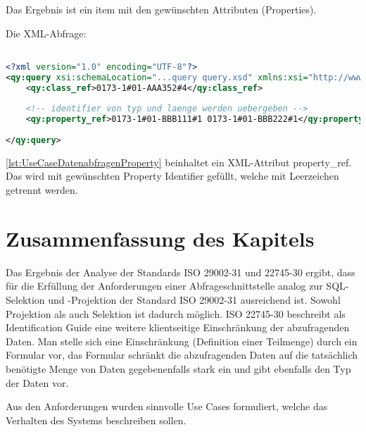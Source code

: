 Das Ergebnis ist ein \gls{item} mit den gewünschten Attributen (Properties). 

Die XML-Abfrage:
\begin{lstlisting}[caption=Query Beispiel - Daten abfragen mit Propertyeinschränkung, language=XML, label=lst:UseCaseDatenabfragenProperty]

<?xml version="1.0" encoding="UTF-8"?>
<qy:query xsi:schemaLocation="...query query.xsd" xmlns:xsi="http://www.w3.org/2001/XMLSchema-instance" xmlns:cat="...catalogue" xmlns:val="...value" xmlns:qy="...query" xmlns:bas="...basic">
	<qy:class_ref>0173-1#01-AAA352#4</qy:class_ref>
	
	<!-- identifier von typ und laenge werden uebergeben -->
	<qy:property_ref>0173-1#01-BBB111#1 0173-1#01-BBB222#1</qy:property_ref> 
	
</qy:query>
\end{lstlisting}

\autoref{lst:UseCaseDatenabfragenProperty} beinhaltet ein XML-Attribut property\_ref. Das wird mit gewünschten Property Identifier gefüllt, welche mit Leerzeichen getrennt werden. 


\section{Zusammenfassung des Kapitels}

Das Ergebnis der Analyse der Standards ISO 29002-31 und 22745-30 ergibt, dass für die Erfüllung der Anforderungen einer Abfrageschnittstelle analog zur SQL-Selektion und -Projektion der Standard ISO 29002-31 ausreichend ist. Sowohl Projektion als auch Selektion ist dadurch möglich. ISO 22745-30 beschreibt als Identification Guide eine weitere klientseitige Einschränkung der abzufragenden Daten. Man stelle sich eine Einschränkung (Definition einer Teilmenge) durch ein Formular vor, das Formular schränkt die abzufragenden Daten auf die tatsächlich benötigte Menge von Daten gegebenenfalls stark ein und gibt ebenfalls den Typ der Daten vor.

Aus den Anforderungen wurden sinnvolle \glspl{Use Case} formuliert, welche das Verhalten des Systems beschreiben sollen.  

